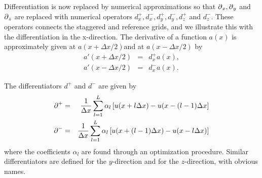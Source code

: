 \documentclass[11pt]{article}
\begin{document}


Differentiation is now replaced by numerical approximations so 
that $\mbox{$\partial$}_x,\mbox{$\partial$}_y$ and $\mbox{$\partial$}_z$ are
replaced with numerical operators $d^+_x,d^-_x,d^+_y,d^-_y,d^+_z$ and $d^-_z$.
These operators connects the staggered and reference grids, and we 
illustrate this with the differentiation
in the x-direction.
The derivative of a function $a(x)$ is approximately given at $a(x+\Delta x/2)$and
at $a(x-\Delta x/2)$ by
\begin{eqnarray}
a'(x+\Delta x/2) & = & d^+_x a(x),\nonumber\\
a'(x-\Delta x/2) & = & d^-_x a(x).
\end{eqnarray}

The differentiators $d^+$ and $d^-$ are given by
\citep{Holberg1987}
%
\begin{eqnarray}
   \mbox{$\partial$}^+ & = & \frac{1}{\Delta x}\sum_{l=1}^L \alpha_l\left[u(x +l\Delta x) -
		          u(x - (l-1)\Delta x\right]\nonumber\\	
   \mbox{$\partial$}^- & = & \frac{1}{\Delta x}\sum_{l=1}^L \alpha_l\left[u(x +(l-1)\Delta x) -
					          u(x - l\Delta x)\right]
\end{eqnarray}
where the coefficients $\alpha_l$ are found through an optimization procedure.
Similar differentiators are defined for the $y$-direction and for 
the $z$-direction, with obvious names.
\end{document}
